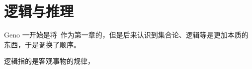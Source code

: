 \chapter{逻辑与推理}\label{ch:LogicAndInference}
    \small{Geno 一开始是将~作为第一章的，但是后来认识到集合论、逻辑等是更加本质的东西，于是调换了顺序。}

    逻辑指的是客观事物的规律，
